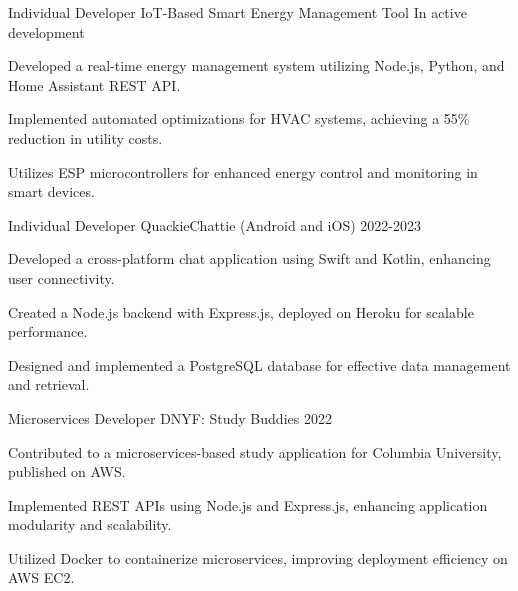 

\begin{cventries}

          \cventry
            {Individual Developer} %
            {IoT-Based Smart Energy Management Tool} %
            {} %
            {In active development} %
            {
              \begin{cvitems} %
              \item {Developed a real-time energy management system utilizing Node.js, Python, and Home Assistant REST API.}
    \item {Implemented automated optimizations for HVAC systems, achieving a 55\% reduction in utility costs.}
    \item {Utilizes ESP microcontrollers for enhanced energy control and monitoring in smart devices.}
              \end{cvitems}
            }

          \cventry
            {Individual Developer} %
            {QuackieChattie (Android and iOS)} %
            {} %
            {2022-2023} %
            {
              \begin{cvitems} %
              \item {Developed a cross-platform chat application using Swift and Kotlin, enhancing user connectivity.}
    \item {Created a Node.js backend with Express.js, deployed on Heroku for scalable performance.}
    \item {Designed and implemented a PostgreSQL database for effective data management and retrieval.}
              \end{cvitems}
            }

          \cventry
            {Microservices Developer} %
            {DNYF: Study Buddies} %
            {} %
            {2022} %
            {
              \begin{cvitems} %
              \item {Contributed to a microservices-based study application for Columbia University, published on AWS.}
    \item {Implemented REST APIs using Node.js and Express.js, enhancing application modularity and scalability.}
    \item {Utilized Docker to containerize microservices, improving deployment efficiency on AWS EC2.}
              \end{cvitems}
            }


\end{cventries}
